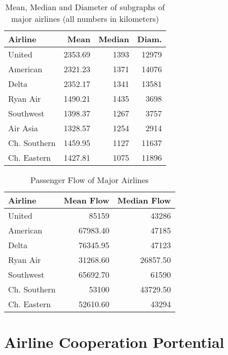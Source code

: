\documentclass[twocolumn]{tum-article}
\begin{document}
\begin{table}[ht]
\begin{center}
 \begin{tabular}{| l | r | r | r |}
 \hline
 \textbf{Airline} & \textbf{Mean} & \textbf{Median} & \textbf{Diam.} \\ 
 \hline
 United & 2353.69 & 1393 & 12979 \\
 \hline   
 American & 2321.23 & 1371 & 14076 \\
 \hline   
 Delta & 2352.17 & 1341 & 13581 \\
 \hline   
 Ryan Air & 1490.21 & 1435 & 3698 \\
 \hline   
 Southwest & 1398.37 & 1267 & 3757 \\
 \hline   
 Air Asia & 1328.57 & 1254 & 2914 \\
 \hline   
 Ch. Southern & 1459.95 & 1127 & 11637 \\
 \hline   
 Ch. Eastern & 1427.81 & 1075 & 11896 \\
 \hline
 \end{tabular}
\caption{Mean, Median and Diameter of subgraphs of major airlines (all numbers in kilometers)}
\label{Tab:distance_airlines}
\end{center}
\end{table}


\begin{table}[ht]
\begin{center}
 \begin{tabular}{| l | r | r |}
 \hline
 \textbf{Airline} & \textbf{Mean Flow} & \textbf{Median Flow} \\ 
 \hline
 United & 85159 & 43286 \\
 \hline
 American & 67983.40 & 47185 \\
 \hline
 Delta & 76345.95  & 47123 \\
 \hline
 Ryan Air & 31268.60 & 26857.50 \\
 \hline
 Southwest & 65692.70  & 61590 \\
 \hline
 Ch. Southern & 53100  & 43729.50 \\
 \hline
 Ch. Eastern & 52610.60  & 43294 \\
 \hline
 \end{tabular}
\caption{Passenger Flow of Major Airlines}
\label{Tab:passenger_flow_airlines}
\end{center}
\end{table}


\section{Airline Cooperation Portential}
\end{document}
